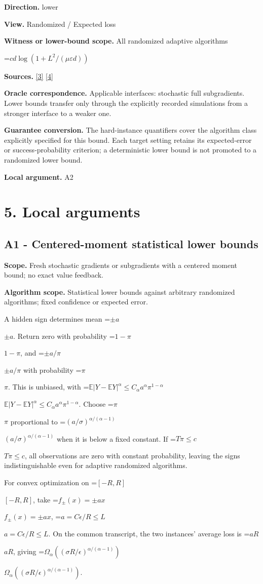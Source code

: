 \documentclass[10pt,a4paper]{article}
\newcommand{\AtlasMath}[1]{\par\begingroup\centering\setbox0=\hbox{$\displaystyle #1$}\ifdim\wd0>1.4\linewidth\typeout{ATLAS WIDE FORMULA: \the\wd0}\fi\ifdim\wd0>\linewidth\resizebox{\linewidth}{!}{\box0}\else\box0\fi\par\endgroup}
\newcommand{\AtlasInlineMath}[1]{\begingroup\setbox0=\hbox{$#1$}\ifdim\wd0>.4\linewidth\endgroup\AtlasMath{#1}\else\endgroup$#1$\fi}
\begin{document}
\textbf{Direction.} lower

\textbf{View.} Randomized / Expected loss

\textbf{Witness or lower-bound scope.} All randomized adaptive algorithms

\AtlasMath{c d\log(1+L^2/(\mu\varepsilon d))}
\textbf{Sources.} \href{https://arxiv.org/pdf/1407.5144}{[3]} \href{https://arxiv.org/pdf/1401.1792}{[4]}

\textbf{Oracle correspondence.} Applicable interfaces: stochastic full subgradients. Lower bounds transfer only through the explicitly recorded simulations from a stronger interface to a weaker one.

\textbf{Guarantee conversion.} The hard-instance quantifiers cover the algorithm class explicitly specified for this bound. Each target setting retains its expected-error or success-probability criterion; a deterministic lower bound is not promoted to a randomized lower bound.

\textbf{Local argument.} A2

\section{5. Local arguments}
\subsection{A1 - Centered-moment statistical lower bounds}
\textbf{Scope.} Fresh stochastic gradients or subgradients with a centered moment bound; no exact value feedback.

\textbf{Algorithm scope.} Statistical lower bounds against arbitrary randomized algorithms; fixed confidence or expected error.

A hidden sign determines mean \AtlasInlineMath{\pm a}. Return zero with probability \AtlasInlineMath{1-\pi}, and \AtlasInlineMath{\pm a/\pi} with probability \AtlasInlineMath{\pi}. This is unbiased, with
\AtlasInlineMath{\mathbb E|Y-\mathbb EY|^\alpha\le C_\alpha a^\alpha\pi^{1-\alpha}}.
Choose \AtlasInlineMath{\pi} proportional to \AtlasInlineMath{(a/\sigma)^{\alpha/(\alpha-1)}} when it is below a fixed constant. If \AtlasInlineMath{T\pi\le c}, all observations are zero with constant probability, leaving the signs indistinguishable even for adaptive randomized algorithms.

For convex optimization on \AtlasInlineMath{[-R,R]}, take \AtlasInlineMath{f_\pm(x)=\pm ax}, \AtlasInlineMath{a=C\epsilon/R\le L}. On the common transcript, the two instances' average loss is \AtlasInlineMath{aR}, giving
\AtlasInlineMath{\Omega_\alpha((\sigma R/\epsilon)^{\alpha/(\alpha-1)})}.
\end{document}
